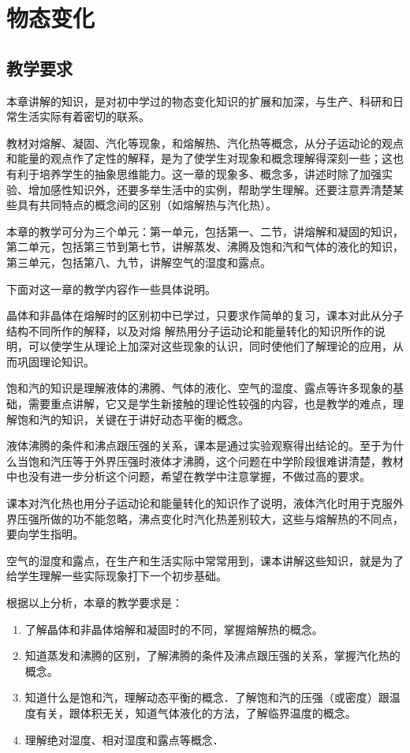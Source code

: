 \chapter{物态变化}
\section{教学要求}
本章讲解的知识，是对初中学过的物态变化知识的扩展和加深，与生产、科研和日常生活实际有着密切的联系。

教材对熔解、凝固、汽化等现象，和熔解热、汽化热等概念，从分子运动论的观点和能量的观点作了定性的解释，是为了使学生对现象和概念理解得深刻一些；这也有利于培养学生的抽象思维能力。这一章的现象多、概念多，讲述时除了加强实验、增加感性知识外，还要多举生活中的实例，帮助学生理解。还要注意弄清楚某些具有共同特点的概念间的区别（如熔解热与汽化热）。

本章的教学可分为三个单元：第一单元，包括第一、二节，讲熔解和凝固的知识，第二单元，包括第三节到第七节，讲解蒸发、沸腾及饱和汽和气体的液化的知识，第三单元，包括第八、九节，讲解空气的湿度和露点。

下面对这一章的教学内容作一些具体说明。

晶体和非晶体在熔解时的区别初中已学过，只要求作简单的复习，课本对此从分子结构不同所作的解释，以及对熔
解热用分子运动论和能量转化的知识所作的说明，可以使学生从理论上加深对这些现象的认识，同时使他们了解理论的应用，从而巩固理论知识。

饱和汽的知识是理解液体的沸腾、气体的液化、空气的湿度、露点等许多现象的基础，需要重点讲解，它又是学生新接触的理论性较强的内容，也是教学的难点，理解饱和汽的知识，关键在于讲好动态平衡的概念。

液体沸腾的条件和沸点跟压强的关系，课本是通过实验观察得出结论的。至于为什么当饱和汽压等于外界压强时液体才沸腾，这个问题在中学阶段很难讲清楚，教材中也没有进一步分析这个问题，希望在教学中注意掌握，不做过高的要求。

课本对汽化热也用分子运动论和能量转化的知识作了说明，液体汽化时用于克服外界压强所做的功不能忽略，沸点变化时汽化热差别较大，这些与熔解热的不同点，要向学生指明。

空气的湿度和露点，在生产和生活实际中常常用到，课本讲解这些知识，就是为了给学生理解一些实际现象打下一个初步基础。

根据以上分析，本章的教学要求是：
\begin{enumerate}
\item 了解晶体和非晶体熔解和凝固时的不同，掌握熔解热的概念。
\item 知道蒸发和沸腾的区别，了解沸腾的条件及沸点跟压强的关系，掌握汽化热的概念。
\item 知道什么是饱和汽，理解动态平衡的概念．了解饱和汽的压强（或密度）跟温度有关，跟体积无关，知道气体液化的方法，了解临界温度的概念。
\item 理解绝对湿度、相对湿度和露点等概念．
\end{enumerate}

